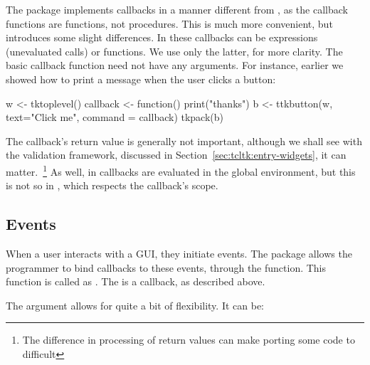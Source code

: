The  package implements callbacks in a manner different
from \TK, as the callback functions are \R\/ functions, not \TK\/
procedures. This is much more convenient, but introduces some slight
differences.  In  these callbacks can be expressions
(unevaluated calls) or functions. We use only the latter, for more
clarity. The basic callback function need not have any arguments. For
instance, earlier we showed how to print a message when the user clicks a
button:
\begin{Schunk}
\begin{Sinput}
 w <- tktoplevel()
 callback <- function() print("thanks")
 b <- ttkbutton(w, text="Click me", command = callback)
 tkpack(b)
\end{Sinput}
\end{Schunk}


The callback's return value is generally not important, although we
shall see with the validation framework, discussed in
Section~\ref{sec:tcltk:entry-widgets}, it can matter.~\footnote{The
  difference in processing of return values can make porting some
  \Tk\/ code to  difficult} As well, in \Tk\/ callbacks are
evaluated in the global environment, but this is not so in
, which respects the callback's scope.



\subsection{Events}
\label{sec:tcltk:events}


When a user interacts with a GUI, they initiate events. The
 package allows the programmer to bind callbacks to these
events, through the  function. This function is
called as . The  is a
callback, as described above.

The  argument allows for quite a bit of flexibility. It can be:

